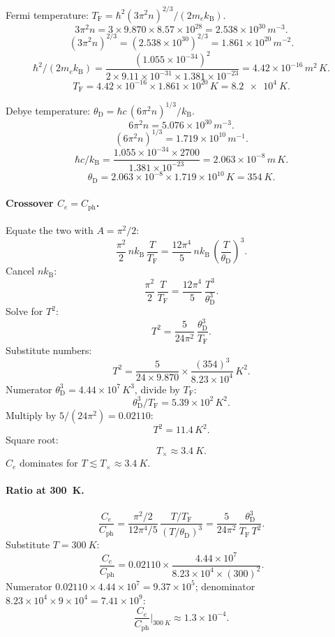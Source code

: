 \documentclass[11pt]{article}
\newcommand{\kB}{k_{\mathrm{B}}}
\newcommand{\TF}{T_{\mathrm{F}}}
\newcommand{\TD}{\theta_{\mathrm{D}}}
\begin{document}
Fermi temperature: $\TF = \hbar^{2}(3\pi^{2} n)^{2/3}/(2 m_{e}\kB)$.
\[
3\pi^{2} n = 3\times 9.870\times 8.57\times 10^{28} = 2.538\times 10^{30}\,\si{m^{-3}}.
\]
\[
(3\pi^{2} n)^{2/3} = (2.538\times 10^{30})^{2/3} = 1.861\times 10^{20}\,\si{m^{-2}}.
\]
\[
\hbar^{2}/(2 m_{e}\kB) = \frac{(1.055\times 10^{-34})^{2}}{2\times 9.11\times 10^{-31}\times 1.381\times 10^{-23}} = 4.42\times 10^{-16}\,\si{m^{2}\,K}.
\]
\[
\TF = 4.42\times 10^{-16}\times 1.861\times 10^{20}\,\si{K} = \SI{8.2e4}{K}.
\]

Debye temperature: $\TD = \hbar c\,(6\pi^{2} n)^{1/3}/\kB$.
\[
6\pi^{2} n = 5.076\times 10^{30}\,\si{m^{-3}}.
\]
\[
(6\pi^{2} n)^{1/3} = 1.719\times 10^{10}\,\si{m^{-1}}.
\]
\[
\hbar c/\kB = \frac{1.055\times 10^{-34}\times 2700}{1.381\times 10^{-23}} = 2.063\times 10^{-8}\,\si{m\,K}.
\]
\[
\TD = 2.063\times 10^{-8}\times 1.719\times 10^{10}\,\si{K} = \SI{354}{K}.
\]

\paragraph{Crossover $C_{e}=C_{\mathrm{ph}}$.} Equate the two with $A=\pi^{2}/2$:
\[
\frac{\pi^{2}}{2}\,n\kB\,\frac{T}{\TF} = \frac{12\pi^{4}}{5}\,n\kB\,\!\left(\frac{T}{\TD}\right)^{3}.
\]
Cancel $n\kB$:
\[
\frac{\pi^{2}}{2}\,\frac{T}{\TF} = \frac{12\pi^{4}}{5}\,\frac{T^{3}}{\TD^{3}}.
\]
Solve for $T^{2}$:
\[
T^{2} = \frac{5}{24\pi^{2}}\,\frac{\TD^{3}}{\TF}.
\]
Substitute numbers:
\[
T^{2} = \frac{5}{24\times 9.870}\times\frac{(354)^{3}}{8.23\times 10^{4}}\,\si{K^{2}}.
\]
Numerator $\TD^{3}=4.44\times 10^{7}\,\si{K^{3}}$, divide by $\TF$:
\[
\TD^{3}/\TF = 5.39\times 10^{2}\,\si{K^{2}}.
\]
Multiply by $5/(24\pi^{2}) = 0.02110$:
\[
T^{2} = 11.4\,\si{K^{2}}.
\]
Square root:
\[
\boxed{\;T_{\times} \approx \SI{3.4}{K}.\;}
\]
$C_{e}$ dominates for $T\lesssim T_{\times}\approx\SI{3.4}{K}$.

\paragraph{Ratio at \SI{300}{K}.}
\[
\frac{C_{e}}{C_{\mathrm{ph}}} = \frac{\pi^{2}/2}{12\pi^{4}/5}\,\frac{T/\TF}{(T/\TD)^{3}} = \frac{5}{24\pi^{2}}\,\frac{\TD^{3}}{\TF\,T^{2}}.
\]
Substitute $T=\SI{300}{K}$:
\[
\frac{C_{e}}{C_{\mathrm{ph}}} = 0.02110\times\frac{4.44\times 10^{7}}{8.23\times 10^{4}\times (300)^{2}}.
\]
Numerator $0.02110\times 4.44\times 10^{7}=9.37\times 10^{5}$; denominator $8.23\times 10^{4}\times 9\times 10^{4} = 7.41\times 10^{9}$:
\[
\boxed{\;\frac{C_{e}}{C_{\mathrm{ph}}}\bigg|_{\SI{300}{K}}\approx 1.3\times 10^{-4}.\;}
\]
\end{document}
